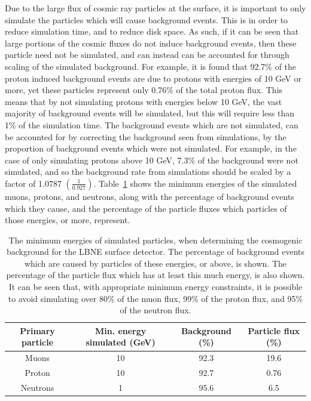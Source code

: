 Due to the large flux of cosmic ray particles at the surface, it is important to only simulate the particles which will cause background events. This is in order to reduce simulation time, and to reduce disk space. As such, if it can be seen that large portions of the cosmic fluxes do not induce background events, then these particle need not be simulated, and can instead can be accounted for through scaling of the simulated background. For example, it is found that 92.7\% of the proton induced background events are due to protons with energies of 10 GeV or more, yet these particles represent only 0.76\% of the total proton flux. This means that by not simulating protons with energies below 10 GeV, the vast majority of background events will be simulated, but this will require less than 1\% of the simulation time. The background events which are not simulated, can be accounted for by correcting the background seen from simulations, by the proportion of background events which were not simulated. For example, in the case of only simulating protons above 10 GeV, 7.3\% of the background were not simulated, and so the background rate from simulations should be scaled by a factor of 1.0787 $\left(\frac{1}{0.927}\right)$. Table~\ref{tab:SurfEnPrim} shows the minimum energies of the simulated muons, protons, and neutrons, along with the percentage of background events which they cause, and the percentage of the particle fluxes which particles of those energies, or more, represent. \\
\begin{table}[h!]
  \caption[The minimum energies of simulated particles, when determining the cosmogenic background for the LBNE surface detector]
          {The minimum energies of simulated particles, when determining the cosmogenic background for the LBNE surface detector. The percentage of background events which are caused by particles of these energies, or above, is shown. The percentage of the particle flux which has at least this much energy, is also shown. It can be seen that, with appropriate minimum energy constraints, it is possible to avoid simulating over 80\% of the muon flux, 99\% of the proton flux, and 95\% of the neutron flux.}
  \centering
  \label{tab:SurfEnPrim}
  \begin{tabular}{c c c c}
    \toprule
        {Primary particle} & {Min. energy simulated (GeV)} & {Background (\%)} & {Particle flux (\%)} \\ 
        \midrule
        Muons              & 10                            & 92.3              & 19.6                 \\

        Proton             & 10                            & 92.7              & 0.76                 \\

        Neutrons           & 1                             & 95.6              & 6.5                  \\
    \bottomrule
  \end{tabular}
\end{table}

